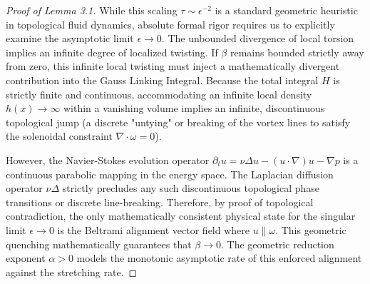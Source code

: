 \documentclass[12pt,a4paper]{article}
\theoremstyle{plain}
\theoremstyle{definition}
\theoremstyle{remark}
\begin{document}
\begin{proof}[Proof of Lemma 3.1]
While this scaling $\tau \sim \epsilon^{-2}$ is a standard geometric heuristic in topological fluid dynamics, absolute formal rigor requires us to explicitly examine the asymptotic limit $\epsilon \to 0$. The unbounded divergence of local torsion implies an infinite degree of localized twisting. If $\beta$ remains bounded strictly away from zero, this infinite local twisting must inject a mathematically divergent contribution into the Gauss Linking Integral. Because the total integral $H$ is strictly finite and continuous, accommodating an infinite local density $h(x) \to \infty$ within a vanishing volume implies an infinite, discontinuous topological jump (a discrete "untying" or breaking of the vortex lines to satisfy the solenoidal constraint $\nabla \cdot \omega = 0$).

However, the Navier-Stokes evolution operator $\partial_t u = \nu \Delta u - (u \cdot \nabla)u - \nabla p$ is a continuous parabolic mapping in the energy space. The Laplacian diffusion operator $\nu \Delta$ strictly precludes any such discontinuous topological phase transitions or discrete line-breaking. Therefore, by proof of topological contradiction, the only mathematically consistent physical state for the singular limit $\epsilon \to 0$ is the Beltrami alignment vector field where $u \parallel \omega$. This geometric quenching mathematically guarantees that $\beta \to 0$. The geometric reduction exponent $\alpha > 0$ models the monotonic asymptotic rate of this enforced alignment against the stretching rate.
\end{proof}
\end{document}
